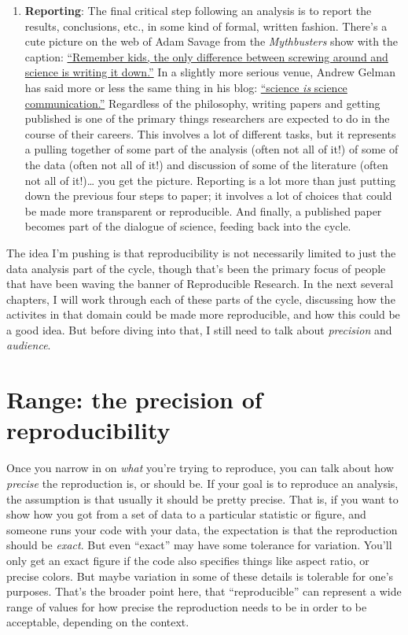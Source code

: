 \documentclass{book}
\begin{document}
\begin{enumerate}
\item \textbf{Reporting}: The final critical step following an analysis is to report the results, conclusions, etc., in some kind of formal, written fashion. There's a cute picture on the web of Adam Savage from the \emph{Mythbusters} show with the caption: \href{http://imgur.com/rnf2K}{``Remember kids, the only difference between screwing around and science is writing it down.''} In a slightly more serious venue, Andrew Gelman has said more or less the same thing in his blog: \href{http://andrewgelman.com/2013/02/22/science-is-science-communication/}{``science \emph{is} science communication.''} Regardless of the philosophy, writing papers and getting published is one of the primary things researchers are expected to do in the course of their careers. This involves a lot of different tasks, but it represents a pulling together of some part of the analysis (often not all of it!) of some of the data (often not all of it!) and discussion of some of the literature (often not all of it!)\ldots{} you get the picture. Reporting is a lot more than just putting down the previous four steps to paper; it involves a lot of choices that could be made more transparent or reproducible. And finally, a published paper becomes part of the dialogue of science, feeding back into the cycle.
\end{enumerate}

The idea I'm pushing is that reproducibility is not necessarily limited to just the data analysis part of the cycle, though that's been the primary focus of people that have been waving the banner of Reproducible Research. In the next several chapters, I will work through each of these parts of the cycle, discussing how the activites in that domain could be made more reproducible, and how this could be a good idea. But before diving into that, I still need to talk about \emph{precision} and \emph{audience}.
\section{Range: the precision of reproducibility}
\label{sec-3-2}

Once you narrow in on \emph{what} you're trying to reproduce, you can talk about how \emph{precise} the reproduction is, or should be.  If your goal is to reproduce an analysis, the assumption is that usually it should be pretty precise. That is, if you want to show how you got from a set of data to a particular statistic or figure, and someone runs your code with your data, the expectation is that the reproduction should be \emph{exact}.  But even ``exact'' may have some tolerance for variation. You'll only get an exact figure if the code also specifies things like aspect ratio, or precise colors.  But maybe variation in some of these details is tolerable for one's purposes. That's the broader point here, that ``reproducible'' can represent a wide range of values for how precise the reproduction needs to be in order to be acceptable, depending on the context.
\end{document}
